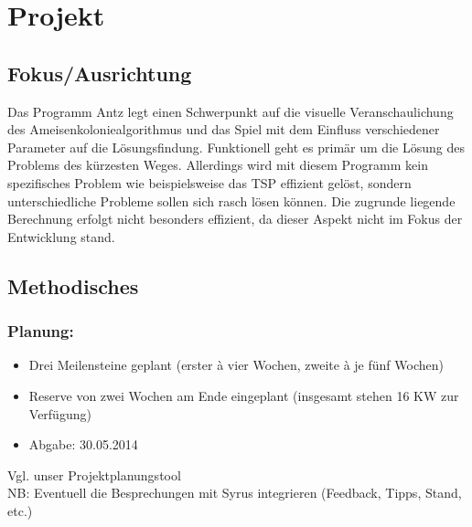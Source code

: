 
\chapter{Projekt}


\section{Fokus/Ausrichtung}

Das Programm Antz legt einen Schwerpunkt auf die visuelle Veranschaulichung des Ameisenkoloniealgorithmus und das Spiel mit dem Einfluss verschiedener Parameter auf die Lösungsfindung. Funktionell geht es primär um die Lösung des Problems des kürzesten Weges. Allerdings wird mit diesem Programm kein spezifisches Problem wie beispielsweise das TSP effizient gelöst, sondern unterschiedliche Probleme sollen sich rasch lösen können. Die zugrunde liegende Berechnung erfolgt nicht besonders effizient, da dieser Aspekt nicht im Fokus der Entwicklung stand.



\vspace*{1cm}



\section{Methodisches}


\subsection*{Planung:}

\begin{itemize}[noitemsep]
\item Drei Meilensteine geplant (erster à vier Wochen, zweite à je fünf Wochen)
\item Reserve von zwei Wochen am Ende eingeplant (insgesamt stehen 16 KW zur Verfügung)
\item Abgabe: 30.05.2014
\end{itemize}

\vspace*{1cm}

Vgl. unser Projektplanungstool \\

NB: Eventuell die Besprechungen mit Syrus integrieren (Feedback, Tipps, Stand, etc.) \\


